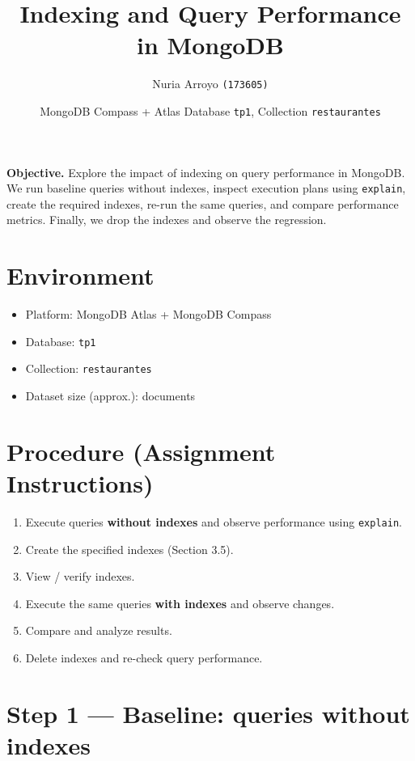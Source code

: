 \documentclass[11pt]{article}
\title{Indexing and Query Performance in MongoDB}
\author{Nuria Arroyo \quad \texttt{(173605)}}
\date{MongoDB Compass + Atlas \; \textbullet \; Database \texttt{tp1}, Collection \texttt{restaurantes}}
\begin{document}
\maketitle

\begin{tcolorbox}
\textbf{Objective.} Explore the impact of indexing on query performance in MongoDB. We run baseline queries without indexes, inspect execution plans using \texttt{explain}, create the required indexes, re-run the same queries, and compare performance metrics. Finally, we drop the indexes and observe the regression.
\end{tcolorbox}

\section{Environment}
\begin{itemize}
  \item Platform: MongoDB Atlas + MongoDB Compass
  \item Database: \texttt{tp1}
  \item Collection: \texttt{restaurantes}
  \item Dataset size (approx.): \underline{\hspace{3cm}} documents
\end{itemize}

\section{Procedure (Assignment Instructions)}
\begin{enumerate}
  \item Execute queries \textbf{without indexes} and observe performance using \texttt{explain}.
  \item Create the specified indexes (Section 3.5).
  \item View / verify indexes.
  \item Execute the same queries \textbf{with indexes} and observe changes.
  \item Compare and analyze results.
  \item Delete indexes and re-check query performance.
\end{enumerate}

\newpage

\section{Step 1 — Baseline: queries without indexes}
\end{document}
